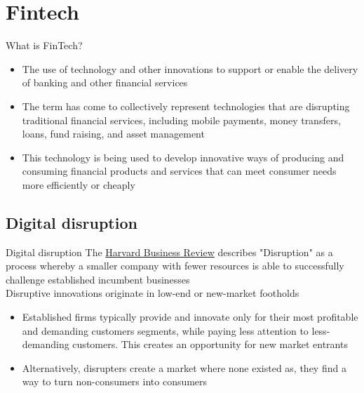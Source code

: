 \documentclass[11pt]{beamer}
\begin{document}
\section{Fintech}

\begin{frame}{What is FinTech?}
	\begin{itemize}
		\item The use of technology and other innovations to support or enable the delivery of banking and other financial services
		\item The term has come to collectively represent technologies that are disrupting traditional financial services, including mobile payments, money transfers, loans, fund raising, and asset management
		\item This technology is being used to develop innovative ways of producing and consuming financial products and services that can meet consumer needs more efficiently or cheaply
	\end{itemize}
\end{frame}

\subsection{Digital disruption}

\begin{frame}{Digital disruption}
	The \href{https://hbr.org/2015/12/what-is-disruptive-innovation}{Harvard Business Review} describes "Disruption" as a process whereby a smaller company with fewer resources is able to successfully challenge established incumbent businesses \\ \vspace{3mm}
	Disruptive innovations originate in low-end or new-market footholds
	\begin{itemize}
		\item Established firms typically provide and innovate only for their most profitable and demanding customers segments, while paying less attention to less-demanding customers. This creates an opportunity for new market entrants
		\item Alternatively, disrupters create a market where none existed as, they find a way to turn non-consumers into consumers
	\end{itemize}
\end{frame}

\end{document}
